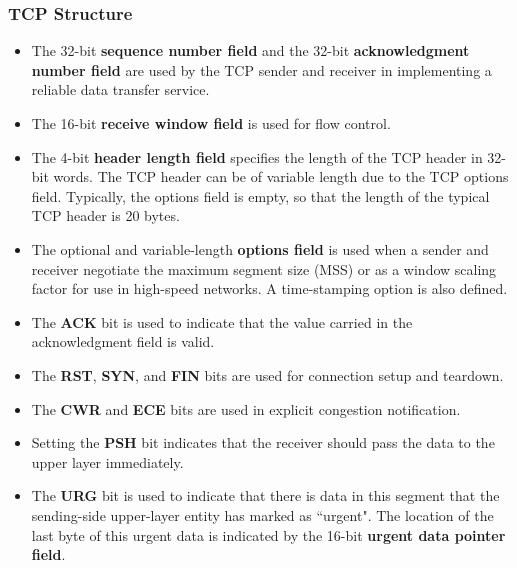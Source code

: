 \documentclass[11pt]{article}
\begin{document}
\subsubsection{TCP Structure}

\begin{itemize}
	\item
	
	The 32-bit \textbf{sequence number field} and the 32-bit \textbf{acknowledgment number field} are used by the TCP sender and receiver in implementing a reliable data transfer service.
	
	\item 
	
	The 16-bit \textbf{receive window field} is used for flow control.
	
	\item
	
	The 4-bit \textbf{header length field} specifies the length of the TCP header in 32-bit words. The TCP header can be of variable length due to the TCP options field. Typically, the options field is empty, so that the length of the typical TCP header is 20 bytes.
	
	\item
	
	The optional and variable-length \textbf{options field} is used when a sender and receiver negotiate the maximum segment size (MSS) or as a window scaling factor for use in high-speed networks. A time-stamping option is also defined.
	
	\item
	
	The \textbf{ACK} bit is used to indicate that the value carried in the acknowledgment field is valid.
	
	\item
	
	The \textbf{RST}, \textbf{SYN}, and \textbf{FIN} bits are used for connection setup and teardown.
	
	\item
	
	The \textbf{CWR} and \textbf{ECE} bits are used in explicit congestion notification.
	
	\item 
	
	Setting the \textbf{PSH} bit indicates that the receiver should pass the data to the upper layer immediately.
	
	\item
	
	The \textbf{URG} bit is used to indicate that there is data in this segment that the sending-side upper-layer entity has marked as ``urgent". The location of the last byte of this urgent data is indicated by the 16-bit \textbf{urgent data pointer field}. 

\end{itemize}
\end{document}
